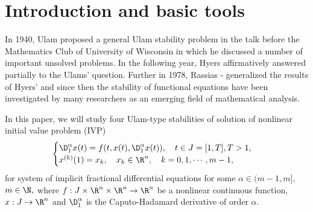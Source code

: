 \section{Introduction and basic tools}
In 1940, Ulam \cite{u1} proposed a general Ulam stability problem in the talk before the Mathematics Club of University of Wisconsin in which he discussed a number of important unsolved problems. In the following year, Hyers \cite{dh} affirmatively answered partially to the Ulams' question. Further in 1978, Rassias \cite{r1}-\cite{r3} generalized the results of Hyers' and since then the stability of functional equations have been investigated by many researchers as an emerging field of mathematical analysis.

In this paper, we will study four Ulam-type stabilities of solution of nonlinear initial value problem (IVP)
\begin{equation}\label{a}\begin{cases}
\D_{1}^{\alpha}x(t)=f(t,x(t),{\D_{1}^{\alpha}x(t)}),\quad t\in{J}=[1,T],T>1,\\
  x^{(k)}(1)=x_k,\quad x_k\in{\R}^{n},\quad k=0,1,\cdots,m-1,
  \end{cases}
\end{equation}
for system of implicit fractional differential equations for some $\alpha\in(m-1,m]$, $m\in\N,$ where $f:J\times{\R}^{n}\times{\R}^{n}\to{\R}^{n}$ be a nonlinear continuous function, $x:J\to{\R}^{n}$ and $\D_{1}^{\alpha}$ is the Caputo-Hadamard derivative of order $\alpha.$



